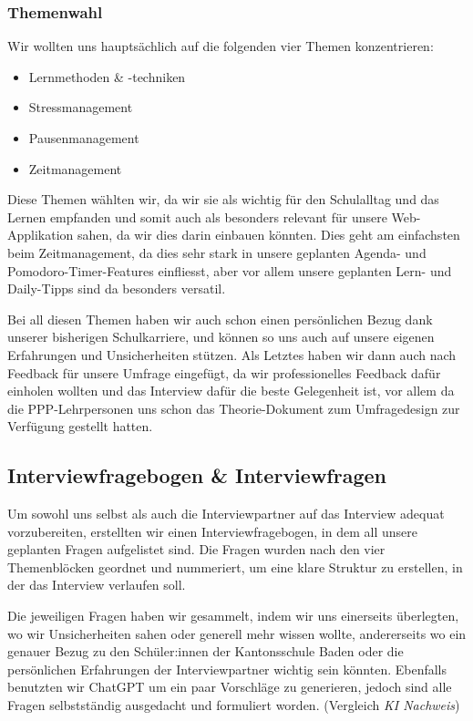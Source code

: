 \documentclass[12pt,a4paper]{report}
\begin{document}
\subsubsection {Themenwahl}
Wir wollten uns hauptsächlich auf die folgenden vier Themen konzentrieren:
\begin{itemize}
    \item Lernmethoden \& -techniken
    \item Stressmanagement
    \item Pausenmanagement
    \item Zeitmanagement
\end{itemize}

Diese Themen wählten wir, da wir sie als wichtig für den Schulalltag und das Lernen empfanden und somit auch als besonders relevant für unsere Web-Applikation sahen,
da wir dies darin einbauen könnten. Dies geht am einfachsten beim Zeitmanagement, da dies sehr stark in unsere geplanten Agenda- und Pomodoro-Timer-Features einfliesst, aber vor allem unsere geplanten Lern- und Daily-Tipps sind da besonders versatil.


Bei all diesen Themen haben wir auch schon einen persönlichen Bezug dank unserer bisherigen Schulkarriere, und können so uns auch auf unsere eigenen Erfahrungen und Unsicherheiten stützen.
Als Letztes haben wir dann auch nach Feedback für unsere Umfrage eingefügt, da wir professionelles Feedback dafür einholen wollten und das Interview dafür die beste Gelegenheit ist, vor allem da die PPP-Lehrpersonen uns schon das Theorie-Dokument zum Umfragedesign zur Verfügung gestellt hatten.

\subsection {Interviewfragebogen \& Interviewfragen}
Um sowohl uns selbst als auch die Interviewpartner auf das Interview adequat vorzubereiten, erstellten wir einen Interviewfragebogen, in dem all unsere geplanten Fragen aufgelistet sind.
Die Fragen wurden nach den vier Themenblöcken geordnet und nummeriert, um eine klare Struktur zu erstellen, in der das Interview verlaufen soll.

Die jeweiligen Fragen haben wir gesammelt, indem wir uns einerseits überlegten, wo wir Unsicherheiten sahen oder generell mehr wissen wollte, andererseits wo ein genauer Bezug zu den Schüler:innen der Kantonsschule Baden oder die persönlichen Erfahrungen der Interviewpartner wichtig sein könnten. 
Ebenfalls benutzten wir ChatGPT um ein paar Vorschläge zu generieren, jedoch sind alle Fragen selbstständig ausgedacht und formuliert worden. (Vergleich \textit{KI Nachweis}) 
\end{document}
